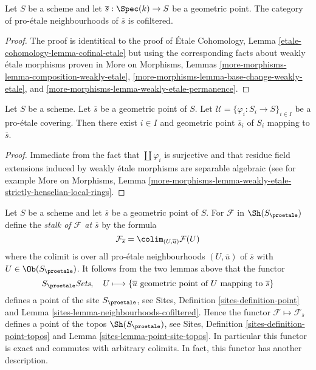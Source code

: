 \begin{lemma}
\label{lemma-cofinal-etale}
Let $S$ be a scheme and let $\overline{s} : \Spec(k) \to S$ be a
geometric point. The category of pro-\'etale neighbourhoods of
$\overline{s}$ is cofiltered.
\end{lemma}

\begin{proof}
The proof is identitical to the proof of
\'Etale Cohomology, Lemma \ref{etale-cohomology-lemma-cofinal-etale}
but using the corresponding facts about weakly \'etale morphisms
proven in
More on Morphisms, Lemmas
\ref{more-morphisms-lemma-composition-weakly-etale},
\ref{more-morphisms-lemma-base-change-weakly-etale}, and
\ref{more-morphisms-lemma-weakly-etale-permanence}.
\end{proof}

\begin{lemma}
\label{lemma-geometric-lift-to-cover}
Let $S$ be a scheme. Let $\overline{s}$ be a geometric point of $S$.
Let $\mathcal{U} = \{\varphi_i : S_i \to S\}_{i\in I}$ be a
pro-\'etale covering. Then there exist $i \in I$ and geometric
point $\overline{s}_i$ of $S_i$ mapping to $\overline{s}$.
\end{lemma}

\begin{proof}
Immediate from the fact that $\coprod \varphi_i$ is surjective
and that residue field extensions induced by weakly \'etale
morphisms are separable algebraic (see for example
More on Morphisms, Lemma
\ref{more-morphisms-lemma-weakly-etale-strictly-henselian-local-rings}.
\end{proof}

\noindent
Let $S$ be a scheme and let $\overline{s}$ be a geometric point of $S$.
For $\mathcal{F}$ in $\Sh(S_\proetale)$ define the
{\it stalk of $\mathcal{F}$ at $\overline{s}$} by the formula
$$
\mathcal{F}_{\overline{s}} = \colim_{(U, \overline{u})} \mathcal{F}(U)
$$
where the colimit is over all pro-\'etale neighbourhoods $(U, \overline{u})$
of $\overline{s}$ with $U \in \Ob(S_\proetale)$. It follows from the
two lemmas above that the functor
$$
S_\proetale \textit{Sets},\quad
U \longmapsto
\{\overline{u}\text{ geometric point of }U\text{ mapping to }\overline{s}\}
$$
defines a point of the site $S_\proetale$, see
Sites, Definition \ref{sites-definition-point} and
Lemma \ref{sites-lemma-neighbourhoods-cofiltered}.
Hence the functor $\mathcal{F} \mapsto \mathcal{F}_{\overline{s}}$
defines a point of the topos $\Sh(S_\proetale)$, see
Sites, Definition \ref{sites-definition-point-topos} and
Lemma \ref{sites-lemma-point-site-topos}. In particular this
functor is exact and commutes with arbitrary colimits.
In fact, this functor has another description.

